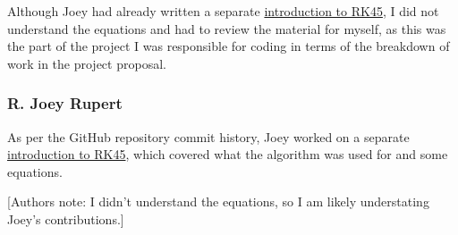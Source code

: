 \documentclass[12pt, letterpaper]{article}
\begin{document}
Although Joey had already written a separate \href{https://github.com/PMARINA/CPE593-FinalProject/blob/cccc07ca08b7014ca53ca4ae4ae105185df95d7e/RKF45_Algorithm.pdf}{introduction to RK45}, I did not understand the equations and had to review the material for myself, as this was the part of the project I was responsible for coding in terms of the breakdown of work in the project proposal.

\subsubsection{R. Joey Rupert}
As per the GitHub repository commit history, Joey worked on a separate \href{https://github.com/PMARINA/CPE593-FinalProject/blob/cccc07ca08b7014ca53ca4ae4ae105185df95d7e/RKF45_Algorithm.pdf}{introduction to RK45}, which covered what the algorithm was used for and some equations.

[Authors note: I didn't understand the equations, so I am likely understating Joey's contributions.]
\end{document}
